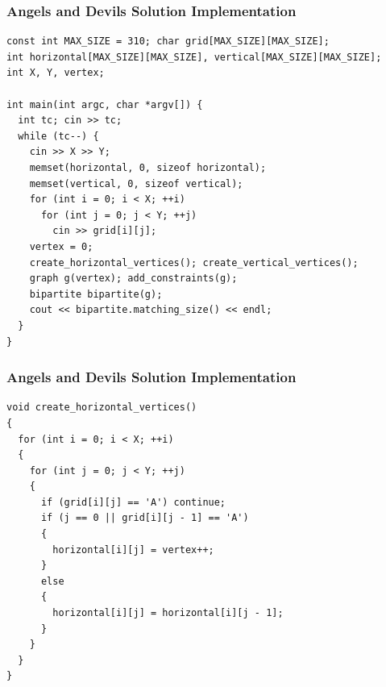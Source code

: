 \documentclass{beamer}
\begin{document}


\begin{frame}[containsverbatim]
\frametitle{Angels and Devils Solution Implementation}
\scriptsize

\begin{lstlisting}
const int MAX_SIZE = 310; char grid[MAX_SIZE][MAX_SIZE];
int horizontal[MAX_SIZE][MAX_SIZE], vertical[MAX_SIZE][MAX_SIZE];
int X, Y, vertex;

int main(int argc, char *argv[]) {
  int tc; cin >> tc;
  while (tc--) {
    cin >> X >> Y;
    memset(horizontal, 0, sizeof horizontal);
    memset(vertical, 0, sizeof vertical);
    for (int i = 0; i < X; ++i)
      for (int j = 0; j < Y; ++j)
        cin >> grid[i][j];
    vertex = 0;
    create_horizontal_vertices(); create_vertical_vertices();
    graph g(vertex); add_constraints(g);
    bipartite bipartite(g);
    cout << bipartite.matching_size() << endl;
  }
}
\end{lstlisting}

\end{frame}

\begin{frame}[containsverbatim]
\frametitle{Angels and Devils Solution Implementation}
\scriptsize

\begin{lstlisting}
void create_horizontal_vertices()
{
  for (int i = 0; i < X; ++i)
  {
    for (int j = 0; j < Y; ++j)
    {
      if (grid[i][j] == 'A') continue;
      if (j == 0 || grid[i][j - 1] == 'A')
      {
        horizontal[i][j] = vertex++;
      }
      else
      {
        horizontal[i][j] = horizontal[i][j - 1];
      }
    }
  }
}
\end{lstlisting}

\end{frame}
\end{document}
